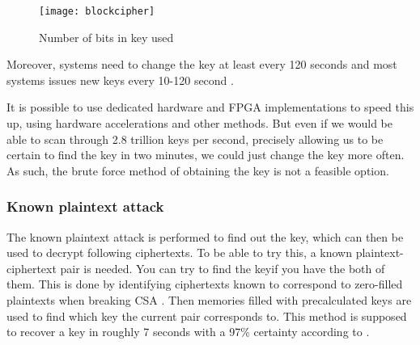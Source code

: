 \begin{figure}[h!]
  \begin{center}
    \texttt{[image: blockcipher]}
  \end{center}
  \caption{Number of bits in key used}
  \label{fig:blockcipher}
\end{figure}

Moreover, systems need to change the key at least every 120 seconds 
\citep{Simpson:2009} and most systems issues new keys every 10-120 
second \citep{Wirt:2004}.

It is possible to use dedicated hardware and FPGA implementations to 
speed this up, using hardware accelerations and other methods. But even 
if we would be able to scan through 2.8 trillion keys per second, 
precisely allowing us to be certain to find the key in two minutes, we 
could just change the key more often. As such, the brute force method 
of obtaining the key is not a feasible option.

\subsubsection{Known plaintext attack}\label{sec:kpa}
The known plaintext attack is performed to find out the key, which can 
then be used to decrypt following ciphertexts. To be able to try this, 
a known plaintext-ciphertext pair is needed. You can try to find the keyif you have the both of them. This is done by identifying ciphertexts 
known to correspond to zero-filled plaintexts when breaking CSA 
\citep{Breaking:2012}. Then memories filled with precalculated keys are 
used to find which key the current pair corresponds to. This method is 
supposed to recover a key in roughly 7 seconds with a 97\% certainty 
according to \citet{Breaking:2012}.
